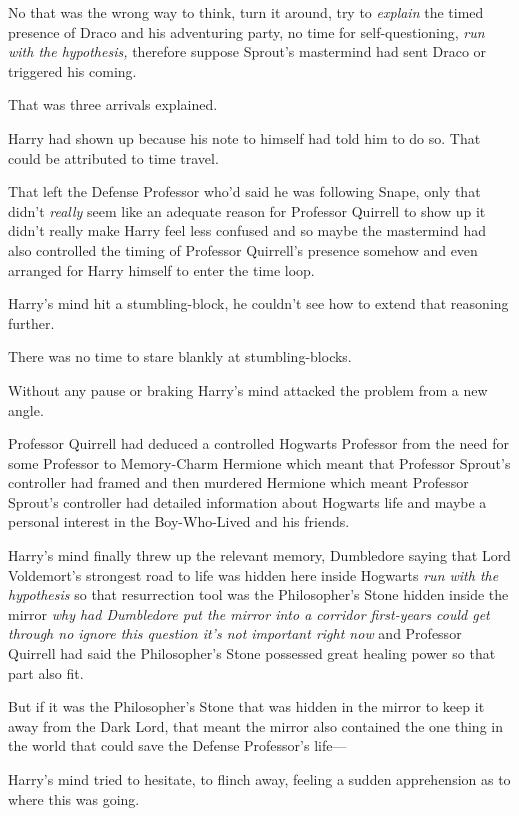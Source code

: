 No that was the wrong way to think, turn it around, try to \emph{explain} the
timed presence of Draco and his adventuring party, no time for
self-questioning, \emph{run with the hypothesis,} therefore suppose Sprout's
mastermind had sent Draco or triggered his coming.

That was three arrivals explained.

Harry had shown up because his note to himself had told him to do so. That
could be attributed to time travel.

That left the Defense Professor who'd said he was following Snape, only that
didn't \emph{really} seem like an adequate reason for Professor Quirrell to
show up it didn't really make Harry feel less confused and so maybe the
mastermind had also controlled the timing of Professor Quirrell's presence
somehow and even arranged for Harry himself to enter the time loop.

Harry's mind hit a stumbling-block, he couldn't see how to extend that
reasoning further.

There was no time to stare blankly at stumbling-blocks.

Without any pause or braking Harry's mind attacked the problem from a new angle.

Professor Quirrell had deduced a controlled Hogwarts Professor from the need
for some Professor to Memory-Charm Hermione which meant that Professor Sprout's
controller had framed and then murdered Hermione which meant Professor Sprout's
controller had detailed information about Hogwarts life and maybe a personal
interest in the Boy-Who-Lived and his friends.

Harry's mind finally threw up the relevant memory, Dumbledore saying that Lord
Voldemort's strongest road to life was hidden here inside Hogwarts \emph{run
with the hypothesis} so that resurrection tool was the Philosopher's Stone
hidden inside the mirror \emph{why had Dumbledore put the mirror into a
corridor first-years could get through no ignore this question it's not
important right now} and Professor Quirrell had said the Philosopher's Stone
possessed great healing power so that part also fit.

But if it was the Philosopher's Stone that was hidden in the mirror to keep it
away from the Dark Lord, that meant the mirror also contained the one thing in
the world that could save the Defense Professor's life---

Harry's mind tried to hesitate, to flinch away, feeling a sudden apprehension
as to where this was going.

